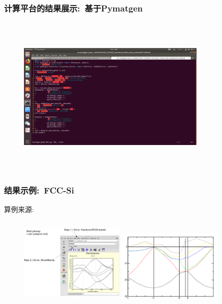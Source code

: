 \documentclass[cjk,slidestop,handout,compress,mathserif,blue]{beamer}	%
\begin{document}
\frame
{
	\frametitle{\textrm{计算平台的结果展示:~基于\textrm{Pymatgen}}}
\begin{figure}[h!]
\centering
\vspace*{-0.2in}
\includegraphics[height=3.1in,width=3.6in,viewport=73 80 880 790,clip]{Figures/Pymatgen_app.png}
\label{Pymatgen_app}
\end{figure} 
}

\frame
{
	\frametitle{\textrm{结果示例:~\textrm{FCC-Si}}}
	算例来源:\\\fontsize{7.5pt}{6.2pt}
\begin{figure}[h!]
\centering
\vspace*{-0.1in}
\includegraphics[height=1.7in,width=2.0in,viewport=550 50 1440 915,clip]{Figures/FCC_Si-p4v-Band.png}
\includegraphics[height=1.5in,width=2.0in,viewport=0 0 500 390,clip]{Figures/FCC_Si-Band.png}
\label{wiki-FCC-Si}
\end{figure} 
}
\end{document}
